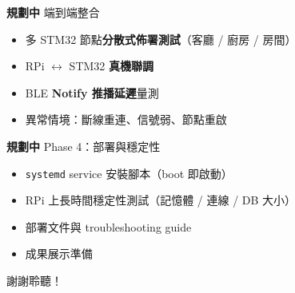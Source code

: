 \documentclass[10pt,aspectratio=169]{beamer}
\newcommand{\pl}[1]{\textcolor{planned}{\textbf{#1}}}
\begin{document}
\begin{frame}{\pl{規劃中} 端到端整合}
  \begin{itemize}
    \item 多 STM32 節點\textbf{分散式佈署測試}（客廳 / 廚房 / 房間）
    \item RPi $\leftrightarrow$ STM32 \textbf{真機聯調}
    \item BLE \textbf{Notify 推播延遲}量測
    \item 異常情境：斷線重連、信號弱、節點重啟
  \end{itemize}
\end{frame}

\begin{frame}{\pl{規劃中} Phase 4：部署與穩定性}
  \begin{itemize}
    \item \texttt{systemd} service 安裝腳本（boot 即啟動）
    \item RPi 上長時間穩定性測試（記憶體 / 連線 / DB 大小）
    \item 部署文件與 troubleshooting guide
    \item 成果展示準備
  \end{itemize}
\end{frame}

\begin{frame}[standout]
  謝謝聆聽！\\
\end{frame}
\end{document}
